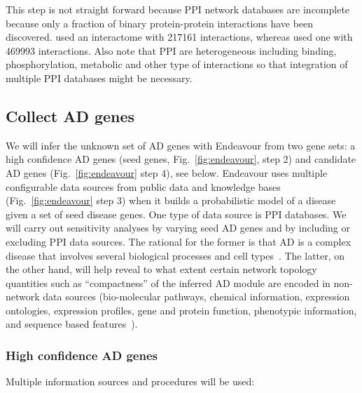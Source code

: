 \documentclass[letterpaper]{article}
\begin{document}
This step is not straight forward because PPI network databases are incomplete
because only a fraction of binary protein-protein interactions have been
discovered. \cite{Cheng2018} used an interactome with 217161 interactions,
whereas \cite{Bai2020} used one with 469993 interactions.  Also note that PPI
are heterogeneous including binding, phosphorylation, metabolic and other type
of interactions so that integration of multiple PPI databases might be
necessary.

\subsection{Collect AD genes}

We will infer the unknown set of AD genes with Endeavour from two gene sets: a
high confidence AD genes (seed genes, Fig.~\ref{fig:endeavour}, step 2) and
candidate AD genes (Fig.~\ref{fig:endeavour} step 4), see below.  Endeavour
uses multiple configurable data sources from public data and knowledge bases
(Fig.~\ref{fig:endeavour} step 3) when it builds a probabilistic model of a
disease given a set of seed disease genes. One type of data source is PPI
databases.  We will carry out sensitivity analyses by varying seed AD genes
and by including or excluding PPI data sources.  The rational for the former
is that AD is a complex disease that involves several biological processes and
cell types~\citep{DeStrooper2016}.  The latter, on the other hand, will help
reveal to what extent certain network topology quantities such as
``compactness'' of the
inferred AD module are encoded in non-network data sources (bio-molecular
pathways, chemical information, expression ontologies, expression profiles,
gene and protein function, phenotypic information, and sequence based
features~\citep{Tranchevent2016}).

\subsubsection{High confidence AD genes}

Multiple information sources and procedures will be used:
\end{document}
